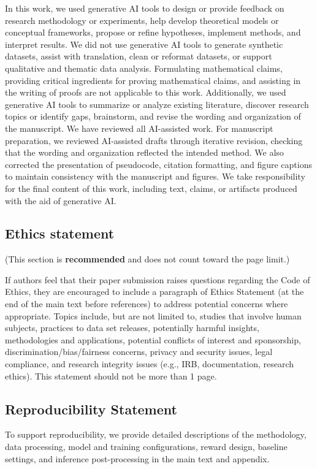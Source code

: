 \documentclass{article} %
\begin{document}
In this work, we used generative AI tools to design or provide feedback on research methodology or experiments, help develop theoretical models or conceptual frameworks, propose or refine hypotheses, implement methods, and interpret results.
We did not use generative AI tools to generate synthetic datasets, assist with translation, clean or reformat datasets, or support qualitative and thematic data analysis.
Formulating mathematical claims, providing critical ingredients for proving mathematical claims, and assisting in the writing of proofs are not applicable to this work.
Additionally, we used generative AI tools to summarize or analyze existing literature, discover research topics or identify gaps, brainstorm, and revise the wording and organization of the manuscript.
We have reviewed all AI-assisted work. For manuscript preparation, we reviewed AI-assisted drafts through iterative revision, checking that the wording and organization reflected the intended method. We also corrected the presentation of pseudocode, citation formatting, and figure captions to maintain consistency with the manuscript and figures. We take responsibility for the final content of this work, including text, claims, or artifacts produced with the aid of generative AI.

\subsection*{Ethics statement}

(This section is \textbf{recommended} and does not count toward the page limit.)

If authors feel that their paper submission raises questions regarding the Code
of Ethics, they are encouraged to include a paragraph of Ethics Statement (at
the end of the main text before references) to address potential concerns where
appropriate. Topics include, but are not limited to, studies that involve human
subjects, practices to data set releases, potentially harmful insights,
methodologies and applications, potential conflicts of interest and sponsorship,
discrimination/bias/fairness concerns, privacy and security issues, legal
compliance, and research integrity issues (e.g., IRB, documentation, research
ethics). This statement should not be more than 1 page.

\subsection*{Reproducibility Statement}

To support reproducibility, we provide detailed descriptions of the methodology, data processing, model and training configurations, reward design, baseline settings, and inference post-processing in the main text and appendix.

\newpage


\newpage
\appendix

\end{document}
